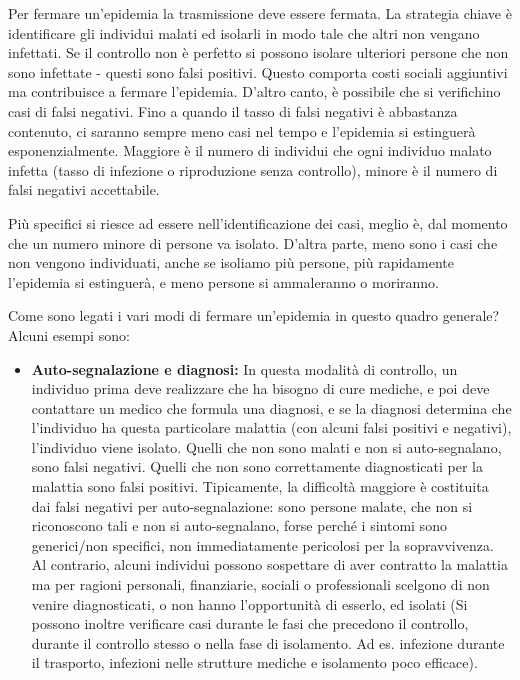 \documentclass[onecolumn,journal]{IEEEtran}
\begin{document}
\begin{multicols}{2}

  Per fermare un’epidemia la trasmissione deve essere fermata. La strategia chiave è identificare gli individui malati ed isolarli in modo tale che altri non vengano infettati. Se il controllo non è perfetto si possono isolare ulteriori persone che non sono infettate - questi sono falsi positivi. Questo comporta costi sociali aggiuntivi ma contribuisce a fermare l’epidemia. D’altro canto, è possibile che si verifichino casi di falsi negativi. Fino a quando il tasso di falsi negativi è abbastanza contenuto, ci saranno sempre meno casi nel tempo e l’epidemia si estinguerà esponenzialmente. Maggiore è il numero di individui che ogni individuo malato infetta (tasso di infezione o riproduzione senza controllo), minore è il numero di falsi negativi accettabile.

  Più specifici si riesce ad essere nell’identificazione dei casi, meglio è, dal momento che un numero minore di persone va isolato. D’altra parte, meno sono i casi che non vengono individuati, anche se isoliamo più persone, più rapidamente l’epidemia si estinguerà, e meno persone si ammaleranno o moriranno.

Come sono legati i vari modi di fermare un’epidemia in questo quadro generale? Alcuni esempi sono:

\begin{itemize}
  \item \textbf{Auto-segnalazione e diagnosi:} In questa modalità di controllo, un individuo prima deve realizzare che ha bisogno di cure mediche, e poi deve contattare un medico che formula una diagnosi, e se la diagnosi determina che l’individuo ha questa particolare malattia (con alcuni falsi positivi e negativi), l’individuo viene isolato. Quelli che non sono malati e non si auto-segnalano, sono falsi negativi. Quelli che non sono correttamente diagnosticati per la malattia sono falsi positivi. Tipicamente, la difficoltà maggiore è costituita dai falsi negativi per auto-segnalazione: sono persone malate, che non si riconoscono tali e non si auto-segnalano, forse perché i sintomi sono generici/non specifici, non immediatamente pericolosi per la sopravvivenza. Al contrario, alcuni individui possono sospettare di aver contratto la malattia ma per ragioni personali, finanziarie, sociali o professionali scelgono di non venire diagnosticati, o non hanno l'opportunità di esserlo, ed isolati (Si possono inoltre verificare casi durante le fasi che precedono il controllo, durante il controllo stesso o  nella fase di isolamento. Ad es. infezione durante il trasporto, infezioni nelle strutture mediche e isolamento poco efficace).


\end{itemize}
\end{multicols}
\end{document}
